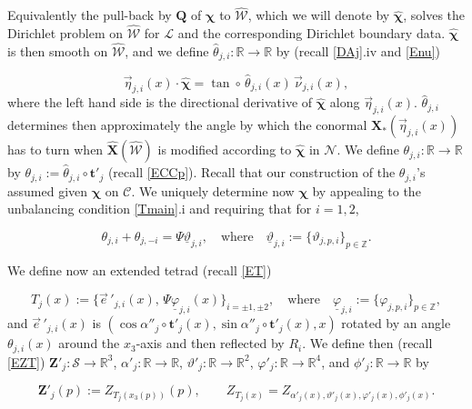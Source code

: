 \documentclass[12pt,namelimits,sumlimits]{amsart}
\theoremstyle{remark}
\numberwithin{equation}{section}
\begin{document}
Equivalently the pull-back by ${\boldsymbol{Q}}$ of ${\boldsymbol{\chi}}$ to ${{\widehat{{\mathcal{W}}}}}$,
which we will denote by ${\widehat{\boldsymbol{\chi}}}$,
solves the Dirichlet problem on ${{\widehat{{\mathcal{W}}}}}$ for ${\ensuremath{\mathcal L}}$ and the corresponding Dirichlet boundary data.
${\widehat{\boldsymbol{\chi}}}$ is then smooth on ${{\widehat{{\mathcal{W}}}}}$,
and we define ${\widehat{\theta}}_{{j,i}}:{\mathbb{R}}\to{\mathbb{R}}$
by (recall \ref{DAj}.iv and \ref{Enu})
\addtocounter{theorem}{1}
\begin{equation}
\label{Ethetahat}
{\vec{\eta}}_{{j,i}}(x)\cdot{\widehat{\boldsymbol{\chi}}}
=
\tan\circ\,{\widehat{\theta}}_{{j,i}}(x)
\,{\vec{\nu}}_{{j,i}}(x),
\end{equation}
where the left hand side is the directional derivative of ${\widehat{\boldsymbol{\chi}}}$ along ${\vec{\eta}}_{{j,i}}(x)$.
${\widehat{\theta}}_{{j,i}}$ determines then approximately the angle by which the conormal ${\boldsymbol{X}}_*({\vec{\eta}}_{{j,i}}(x))$
has to turn when ${\widehat{\boldsymbol{X}}}({{\widehat{{\mathcal{W}}}}})$ is modified according to ${\widehat{\boldsymbol{\chi}}}$ in ${{\mathcal{N}}}$.
We define $\theta_{{j,i}}:{\mathbb{R}}\to{\mathbb{R}}$ by $\theta_{{j,i}}:={\widehat{\theta}}_{{j,i}}\circ {\boldsymbol{t}}'_j$
(recall \ref{ECCp}).
Recall that our construction of the $\theta_{{j,i}}$'s
assumed given ${\boldsymbol{\chi}}$ on ${{\mathcal{C}}}$.
We uniquely determine now ${\boldsymbol{\chi}}$ by appealing to the unbalancing condition \ref{Tmain}.i
and requiring that for $i=1,2$,
\addtocounter{theorem}{1}
\begin{equation}
\label{Etheta}
\theta_{{j,i}}
+
\theta_{j,-i}
=
\Psi\underline{\vartheta}_{{j,i}},
\quad\text{where}\quad
\underline{\vartheta}_{{j,i}}:=\{\vartheta_{j,p,i}\}_{p\in{\mathbb{Z}}}.
\end{equation}

We define now an extended tetrad (recall \ref{ET})
\addtocounter{theorem}{1}
\begin{equation}
\label{ETjx}
T_j(x):=\{{\vec{e}^{\,} {}'_{\!{{j,i}}}}(x),\,\Psi\underline{\varphi}_{{j,i}}(x)\}_{i=\pm1,\pm2} ,
\quad\text{where}\quad
\underline{\varphi}_{{j,i}}:=\{\varphi_{j,p,i}\}_{p\in{\mathbb{Z}}},
\end{equation}
and ${\vec{e}^{\,} {}'_{\!{{j,i}}}}(x)$ is 
$(\cos\alpha''_j\circ {\boldsymbol{t}}'_j(x),\sin\alpha''_j\circ {\boldsymbol{t}}'_j(x),x)$
rotated by an angle
$\theta_{{j,i}}(x)$ around the $x_3$-axis and then reflected by $R_i$.
We define then (recall \ref{EZT}) ${\boldsymbol{Z}}'_j:{{\mathcal{S}}}\to{{{\mathbb{R}}^3}}$,
$\alpha'_j:{\mathbb{R}}\to{\mathbb{R}}$,
$\vartheta'_j:{\mathbb{R}}\to{{{\mathbb{R}}^2}}$,
$\varphi'_j:{\mathbb{R}}\to{{{\mathbb{R}}^4}}$,
and
$\phi'_j:{\mathbb{R}}\to{\mathbb{R}}$ by 
\addtocounter{theorem}{1}
\begin{equation}
\label{EZp}
{\boldsymbol{Z}}'_j(p):=Z_{T_j(x_3(p))}(p),
\qquad
Z_{T_j(x)}=Z_{{\alpha'_j(x),\vartheta'_j(x),\varphi'_j(x),\phi'_j(x)}}.
\end{equation}
\end{document}
